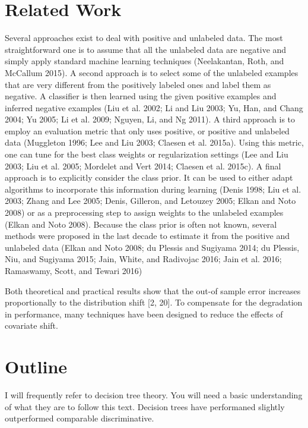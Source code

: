 \section{Related Work}

Several approaches exist to deal with positive and unlabeled data. The most straightforward one is to assume that all the unlabeled data are negative and simply apply standard machine learning techniques (Neelakantan, Roth, and McCallum 2015). A second approach is to select some of the unlabeled examples that are very different from the positively labeled ones and label them as negative. A classiﬁer is then learned using the given positive examples and inferred negative examples (Liu et al. 2002; Li and Liu 2003; Yu, Han, and Chang 2004; Yu 2005; Li et al. 2009; Nguyen, Li, and Ng 2011). A third approach is to employ an evaluation metric that only uses positive, or positive and unlabeled data (Muggleton 1996; Lee and Liu 2003; Claesen et al. 2015a). Using this metric, one can tune for the best class weights or regularization settings (Lee and Liu 2003; Liu et al. 2005; Mordelet and Vert 2014; Claesen et al. 2015c). A ﬁnal approach is to explicitly consider the class prior. It can be used to either adapt algorithms to incorporate this information during learning (Denis 1998; Liu et al. 2003; Zhang and Lee 2005; Denis, Gilleron, and Letouzey 2005; Elkan and Noto 2008) or as a preprocessing step to assign weights to the unlabeled examples (Elkan and Noto 2008). Because the class prior is often not known, several methods were proposed in the last decade to estimate it from the positive and unlabeled data (Elkan and Noto 2008; du Plessis and Sugiyama 2014; du Plessis, Niu, and Sugiyama 2015; Jain, White, and Radivojac 2016; Jain et al. 2016; Ramaswamy, Scott, and Tewari 2016) 

Both theoretical and practical results show that the out-of sample error increases proportionally to the distribution shift [2, 20]. To compensate for the degradation in performance, many techniques have been designed to reduce the effects of covariate shift.

\section{Outline}

I will frequently refer to decision tree theory. You will need a basic understanding of what they are to follow this text. Decision trees have performaned slightly outperformed comparable discriminative.

